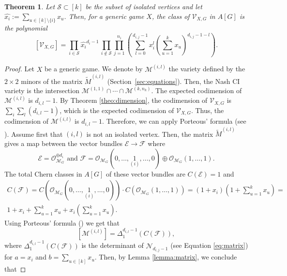 \documentclass[11pt]{amsart}
\numberwithin{equation}{section}
\theoremstyle{plain}
\newtheorem{theorem}{Theorem}
\numberwithin{theorem}{section}
\theoremstyle{definition}
\newcommand{\ko}{{\mathcal O}}
\newcommand{\Mg}{{\mathcal M}_G}
\newcommand{\Vc}{{\mathcal V}_{X,G}}
\begin{document}

\begin{theorem}\label{theo: class of Nash}
Let $\mathcal S\subset[k]$ be the subset of isolated vertices and let $\widehat{x_i}:=\sum_{u\in[k]\setminus\{i\}}x_u$. Then, 
    for a generic game $X$, the class of $\Vc$ in $A[G]$ is the polynomial
    \begin{equation}
        \label{eq:poly chow}
        [\Vc]= \displaystyle\prod_{i\in\mathcal S}  \widehat{x_i}^{d_i-1} \,\prod_{i\not\in\mathcal S}\prod_{j=1}^{n_i}\left(    
        \sum_{l=0}^{d_{i,j}-1} x_i^l\left(\sum_{u=1}^kx_u\right)^{d_{i,j}-1-l}
        \right).
    \end{equation}
\end{theorem}
\begin{proof}
Let $X$ be a generic game.
We denote by $\mathcal{M}^{(i,l)}$ the variety defined by the $2\times2$ minors of the matrix $\widetilde{M}^{(i,l)}$ (Section~\ref{sec:equations}). Then, the Nash CI variety is the intersection $\mathcal{M}^{(1,1)}\cap\cdots \cap \mathcal{M}^{(k,n_k)}$. The expected codimension of $\mathcal{M}^{(i,l)}$ is $d_{i,l}-1$. By Theorem \ref{theo:dimension}, the codimension of $\Vc$ is $\sum_i\sum_l (d_{i,l}-1)$, which is the expected codimension of $\Vc$. Thus, the codimension of $\mathcal{M}^{(i,l)}$ is $d_{i,l}-1$. Therefore, we can apply  Porteous' formula (see \cite[Theorem 12.4]{eisenbud20163264}). Assume first that $(i,l)$ is not an isolated vertex. Then, the matrix $\widetilde{M}^{(i,l)}$ gives a map between the vector bundles $\mathcal{E}\rightarrow\mathcal{F}$ where
\[
\mathcal{E}=\ko_{\Mg}^{\oplus d_i} \text{ and } \mathcal{F}= \ko_{\Mg}(0,\ldots,\underset{(i)}{1},\ldots, 0)\oplus\ko_{\Mg}(1,\ldots,1).
\]
The total Chern classes in $A[G]$ of these vector bundles are $C(\mathcal{E})=1$ and 
\[\begin{array}{c}
\displaystyle C(\mathcal{F}) = C( \ko_{\Mg}(0,\ldots,\underset{(i)}{1},\ldots, 0))\cdot C(\ko_{\Mg}(1,\ldots,1))=(1+x_i)\left(1+\sum_{u=1}^k x_u\right)=\\ \displaystyle
1+ x_i+\sum_{u=1}^k x_u +x_i\left(\sum_{u=1}^k x_u\right).
\end{array}
\]
Using Porteous' formula (\cite[Theorem 12.4]{eisenbud20163264}) we get that 
\[
\left[\mathcal{M}^{(i,l)}\right]=\Delta_1^{d_{i,l}-1}\left( C(\mathcal{F})\right),
\]
where $\Delta_1^{d_{i,l}-1}\left( C(\mathcal{F})\right)$ is the determinant of $\mathcal N_{d_{i,j}-1}$ (see Equation \eqref{eq:matrix}) for $a=x_i$ and $b=\sum_{u\in[k]} x_u $. Then, by Lemma \ref{lemma:matrix}, we conclude that 

\end{proof}
\end{document}
